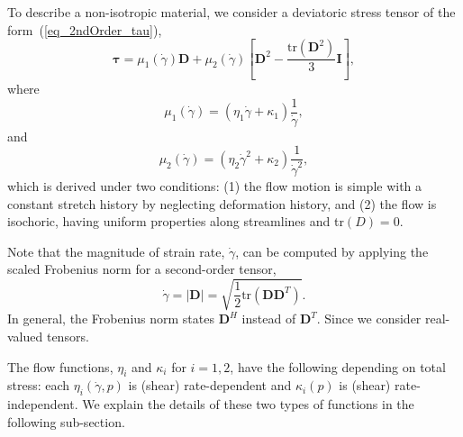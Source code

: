 To describe a non-isotropic material, we consider a deviatoric stress tensor of the form~(\ref{eq_2ndOrder_tau}), 
\begin{equation}
  {\bm {\bm \tau}}
  = \mu_1(\dot{\gamma}) {\bm D}
  +  
 \mu_2 (\dot{\gamma})
  \left[ {\bm D}^2  - \frac{\text{tr}\left({\bm D}^2\right)}{3}{\bm I} \right],
\label{eq_2ndOrder_tau}
\end{equation}
where 
\begin{equation}
  \mu_1 (\dot{\gamma})
   = \left( \eta_1 \dot{\gamma}+ \kappa_1 \right) \frac{1}{\dot{\gamma}},
\label{eq_mu1_main}
\end{equation}
and 
\begin{equation}
  \mu_2 (\dot{\gamma}) = 
  \left( \eta_2  \dot{\gamma}^2
  +  \kappa_2 
  \right) \frac{1}{\dot{\gamma}^2},
  \label{eq_mu2_main}
\end{equation}
which is derived under two conditions:
(1) the flow motion is simple with a constant stretch history by neglecting deformation history, and (2) the flow is isochoric, having uniform properties along streamlines and tr$(D) = 0$. 

Note that the magnitude of strain rate, $\dot{\gamma}$, can be computed by applying the scaled Frobenius norm for a second-order tensor, 
\[
  \dot{\gamma}  = |\bm{D}| = \sqrt{\frac{1}{2}
    \text{tr}\left(\bm{D} \bm{D}^{T} \right)}.
\]
In general, the Frobenius norm states $\bm{D}^H$ instead of $\bm{D}^T$. Since we consider real-valued tensors.
\par
The flow functions, $\eta_i$ and $\kappa_i$ for $i = 1,2$, have the following depending on total stress: each $\eta_i(\dot{\gamma}, p)$ is (shear) rate-dependent and $\kappa_i (p)$ is (shear) rate-independent. 
We explain the details of these two types of functions in the following sub-section.

